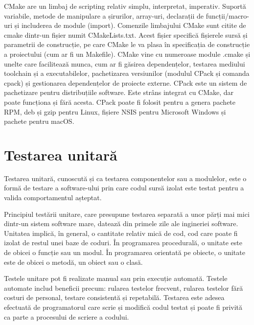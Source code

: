 \documentclass[a4paper,12pt]{report}
\begin{document}
CMake are un limbaj de scripting relativ simplu, interpretat, imperativ. Suportă variabile, metode de manipulare a șirurilor, array-uri, declarații de funcții/macro-uri și includerea de module (import). Comenzile limbajului CMake sunt citite de cmake dintr-un fișier numit CMakeLists.txt. Acest fișier specifică fișierele sursă și parametrii de construcție, pe care CMake le va plasa în specificația de construcție a proiectului (cum ar fi un Makefile). CMake vine cu numeroase module .cmake și unelte care facilitează munca, cum ar fi găsirea dependențelor, testarea mediului toolchain și a executabilelor, pachetizarea versiunilor (modulul CPack și comanda cpack) și gestionarea dependențelor de proiecte externe. CPack este un sistem de pachetizare pentru distribuțiile software. Este strâns integrat cu CMake, dar poate funcționa și fără acesta. CPack poate fi folosit pentru a genera pachete RPM, deb și gzip pentru Linux, fișiere NSIS pentru Microsoft Windows și pachete pentru macOS.

\section{Testarea unitară}
Testarea unitară, cunoscută și ca testarea componentelor sau a modulelor, este o formă de testare a software-ului prin care codul sursă izolat este testat pentru a valida comportamentul așteptat.

Principiul testării unitare, care presupune testarea separată a unor părți mai mici dintr-un sistem software mare, datează din primele zile ale ingineriei software. Unitatea implică, în general, o cantitate relativ mică de cod, cod care poate fi izolat de restul unei baze de coduri. În programarea procedurală, o unitate este de obicei o funcție sau un modul. În programarea orientată pe obiecte, o unitate este de obicei o metodă, un obiect sau o clasă.

Testele unitare pot fi realizate manual sau prin execuție automată. Testele automate includ beneficii precum: rularea testelor frecvent, rularea testelor fără costuri de personal, testare consistentă și repetabilă. Testarea este adesea efectuată de programatorul care scrie și modifică codul testat și poate fi privită ca parte a procesului de scriere a codului.
\end{document}
